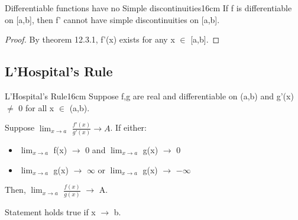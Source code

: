     \vspace{0.5cm}



    \begin{corollary}{Differentiable functions have no Simple discontinuities}{16cm}
        If f is differentiable on [a,b], then f' cannot have simple discontinuities
        on [a,b].
    \end{corollary}

    \begin{proof}
        By {\color{red} theorem 12.3.1}, f'(x) exists for any x $\in$ [a,b].
    \end{proof}

    \newpage





\subsection{ L'Hospital's Rule }

    \begin{wtheorem}{L'Hospital's Rule}{16cm}
        Suppose f,g are real and differentiable on (a,b) and g'(x) $\not =$ 0
        for all x $\in$ (a,b).
        
        Suppose $\lim_{x \rightarrow a}$ $\frac{f'(x)}{g'(x)} \rightarrow A$.
        If either:
        
        \begin{itemize}[leftmargin=1cm, itemsep=0.1cm]
            \item                        
                $\lim_{x \rightarrow a}$ f(x) $\rightarrow$ 0 and
                $\lim_{x \rightarrow a}$ g(x) $\rightarrow$ 0

            \item
                $\lim_{x \rightarrow a}$ g(x) $\rightarrow$ $\infty$ or
                $\lim_{x \rightarrow a}$ g(x) $\rightarrow$ $-\infty$
        \end{itemize}

        Then, $\lim_{x \rightarrow a}$ $\frac{f(x)}{g(x)}$ $\rightarrow$ A.

        Statement holds true if x $\rightarrow$ b.
    \end{wtheorem}

